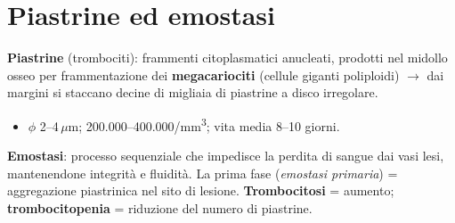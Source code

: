 \section{Piastrine ed emostasi}

\textbf{Piastrine} (trombociti): frammenti citoplasmatici anucleati, prodotti nel midollo osseo per
frammentazione dei \textbf{megacariociti} (cellule giganti poliploidi) $\rightarrow$ dai margini si
staccano decine di migliaia di piastrine a disco irregolare.
\begin{itemize}
  \item $\phi$ 2--4\,$\mu$m; 200.000--400.000/mm\textsuperscript{3}; vita media 8--10 giorni.
\end{itemize}

\textbf{Emostasi}: processo sequenziale che impedisce la perdita di sangue dai vasi lesi,
mantenendone integrità e fluidità. La prima fase (\textit{emostasi primaria}) = aggregazione
piastrinica nel sito di lesione. \textbf{Trombocitosi} = aumento; \textbf{trombocitopenia} =
riduzione del numero di piastrine.
